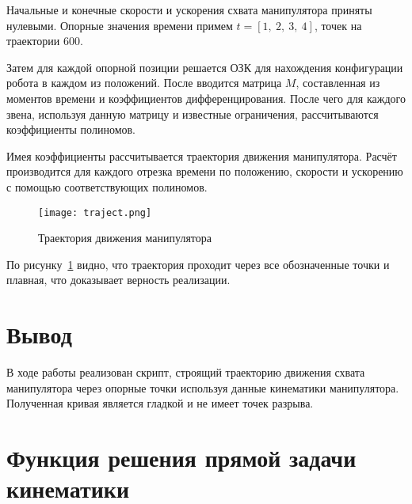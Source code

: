 \documentclass[14pt]{extarticle}
\begin{document}
    Начальные и конечные скорости и ускорения схвата манипулятора приняты нулевыми.
    Опорные значения времени примем $t = \left[1,\ 2,\ 3,\ 4 \right]$, точек на траектории 600.

    Затем для каждой опорной позиции решается ОЗК для нахождения конфигурации робота в каждом из положений.
    После вводится матрица $M$, составленная из моментов времени и коэффициентов дифференцирования.
    После чего для каждого звена, используя данную матрицу и известные ограничения, рассчитываются коэффициенты полиномов.

    Имея коэффициенты рассчитывается траектория движения манипулятора. Расчёт производится для каждого отрезка
    времени по положению, скорости и ускорению с помощью соответствующих полиномов.

    \begin{figure}[H]
        \centering
        \texttt{[image: traject.png]}
        \caption{Траектория движения манипулятора}
        \label{pic:traject}
    \end{figure}

    По рисунку~\ref{pic:traject} видно, что траектория проходит через все обозначенные точки и плавная, что доказывает
    верность реализации.

    \section*{Вывод}
    В ходе работы реализован скрипт, строящий траекторию движения схвата манипулятора через опорные точки
    используя данные кинематики манипулятора. Полученная кривая является гладкой и не имеет точек разрыва.

    \appendix \newpage
    \renewcommand{\thesection}{\Asbuk{section}}
    \section{Функция решения прямой задачи кинематики}\label{code:spline}
\end{document}
